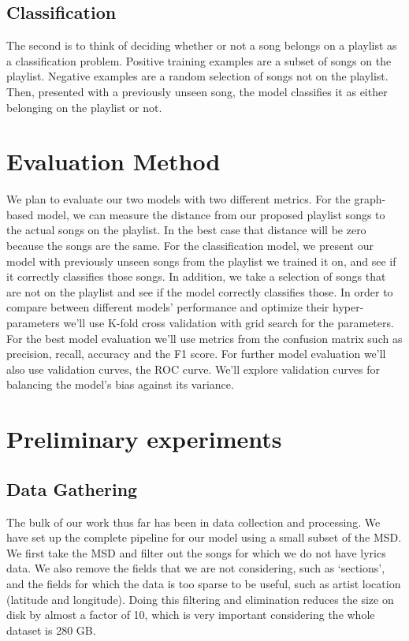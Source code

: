 \documentclass[10pt,journal,compsoc]{IEEEtran}
\begin{document}
\subsection{Classification}
The second is to think of deciding whether or not a song belongs on a playlist as a classification problem. Positive training examples are a subset of songs on the playlist. Negative examples are a random selection of songs not on the playlist. Then, presented with a previously unseen song, the model classifies it as either belonging on the playlist or not.

\section{Evaluation Method}
We plan to evaluate our two models with two different metrics. For the graph-based model, we can measure the distance from our proposed playlist songs to the actual songs on the playlist. In the best case that distance will be zero because the songs are the same. For the classification model, we present our model with previously unseen songs from the playlist we trained it on, and see if it correctly classifies those songs. In addition, we take a selection of songs that are not on the playlist and see if the model correctly classifies those. In order to compare between different models' performance and optimize their hyper-parameters we'll use K-fold cross validation with grid search for the parameters. For the best model evaluation we'll use metrics from the confusion matrix such as precision, recall, accuracy and the F1 score. For further model evaluation we'll also use validation curves, the ROC curve. We'll explore validation curves for balancing the model's bias against its variance.

\section{Preliminary experiments}

\subsection{Data Gathering}
The bulk of our work thus far has been in data collection and processing. We have set up the complete pipeline for our model using a small subset of the MSD. We first take the MSD and filter out the songs for which we do not have lyrics data. We also remove the fields that we are not considering, such as `sections', and the fields for which the data is too sparse to be useful, such as artist location (latitude and longitude). Doing this filtering and elimination reduces the size on disk by almost a factor of 10, which is very important considering the whole dataset is 280 GB.
\end{document}
